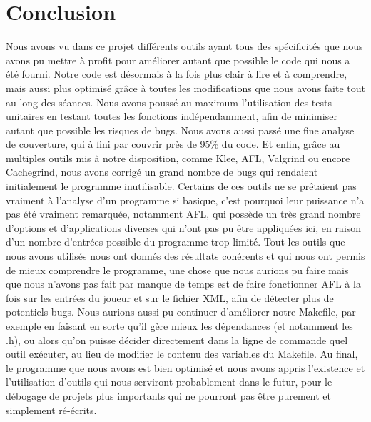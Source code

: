 \documentclass{report}
\begin{document}
\chapter{Conclusion}
Nous avons vu dans ce projet différents outils ayant tous des spécificités que nous avons pu mettre à profit pour améliorer autant que possible le code qui nous a été fourni.
\newline
Notre code est désormais à la fois plus clair à lire et à comprendre, mais aussi plus optimisé grâce à toutes les modifications que nous avons faite tout au long des séances.
\newline
Nous avons poussé au maximum l'utilisation des tests unitaires en testant toutes les fonctions indépendamment, afin de minimiser autant que possible les risques de bugs.
\newline 
Nous avons aussi passé une fine analyse de couverture, qui à fini par couvrir près de 95\% du code.
\newline 
Et enfin, grâce au multiples outils mis à notre disposition, comme Klee, AFL, Valgrind ou encore Cachegrind, nous avons corrigé un grand nombre de bugs qui rendaient initialement le programme inutilisable.
\newline
Certains de ces outils ne se prêtaient pas vraiment à l'analyse d'un programme si basique, c'est pourquoi leur puissance n'a pas été vraiment remarquée, notamment AFL, qui possède un très grand nombre d'options et d'applications diverses qui n'ont pas pu être appliquées ici, en raison d'un nombre d'entrées possible du programme trop limité. 
\newline
Tout les outils que nous avons utilisés nous ont donnés des résultats cohérents et qui nous ont permis de mieux comprendre le programme, une chose que nous aurions pu faire mais que nous n'avons pas fait par manque de temps est de faire fonctionner AFL à la fois sur les entrées du joueur et sur le fichier XML, afin de détecter plus de potentiels bugs.
Nous aurions aussi pu continuer d'améliorer notre Makefile, par exemple en faisant en sorte qu'il gère mieux les dépendances (et notamment les .h), ou alors qu'on puisse décider directement dans la ligne de commande quel outil exécuter, au lieu de modifier le contenu des variables du Makefile.
\newline  
Au final, le programme que nous avons est bien optimisé et nous avons appris l'existence et l'utilisation d'outils qui nous serviront probablement dans le futur, pour le débogage de projets plus importants qui ne pourront pas être purement et simplement ré-écrits.














 
\end{document}
